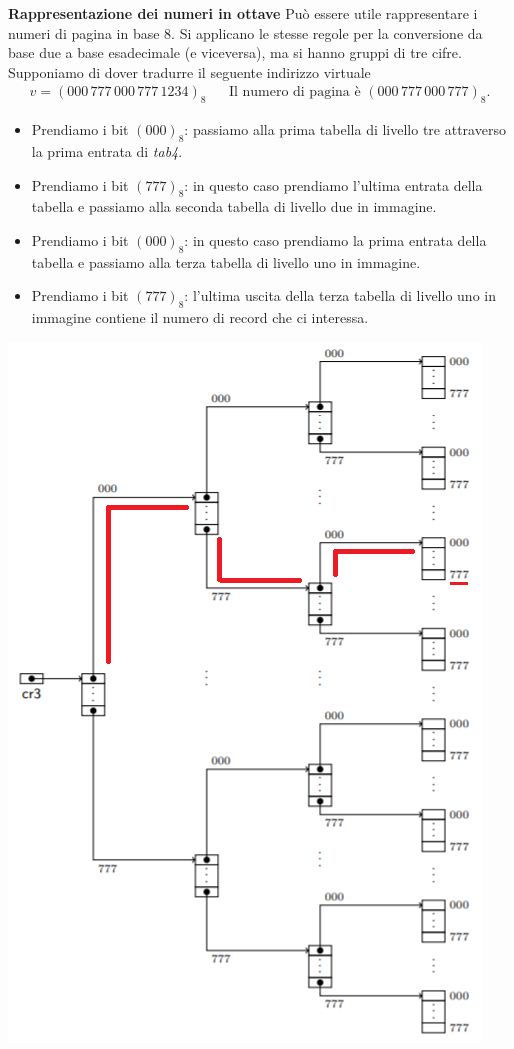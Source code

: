 \clearpage 
\begin{framed}
	\noindent \textbf{Rappresentazione dei numeri in ottave} Può essere utile rappresentare i numeri di pagina in base 8. Si applicano le stesse regole per la conversione da base due a base esadecimale (e viceversa), ma si hanno gruppi di tre cifre. Supponiamo di dover tradurre il seguente indirizzo virtuale
	\begin{align*}v=\left(000\,777\,000\,777\,1234\right)_8&&\text{Il numero di pagina è $\left(000\,777\,000\,777\right)_8$.}\end{align*}
	\begin{itemize}
		\item Prendiamo i bit $(000)_8$: passiamo alla prima tabella di livello tre attraverso la prima entrata di \emph{tab4}. 
		\item Prendiamo i bit $(777)_8$: in questo caso prendiamo l'ultima entrata della tabella e passiamo alla seconda tabella di livello due in immagine.
		\item Prendiamo i bit $(000)_8$: in questo caso prendiamo la prima entrata della tabella e passiamo alla terza tabella di livello uno in immagine.
		\item Prendiamo i bit $(777)_8$: l'ultima uscita della terza tabella di livello uno  in immagine contiene il numero di record che ci interessa.
	\end{itemize}
	
	\begin{center}
		\includegraphics[scale=.8]{img/232.PNG}
	\end{center}
\end{framed} 
\clearpage 
